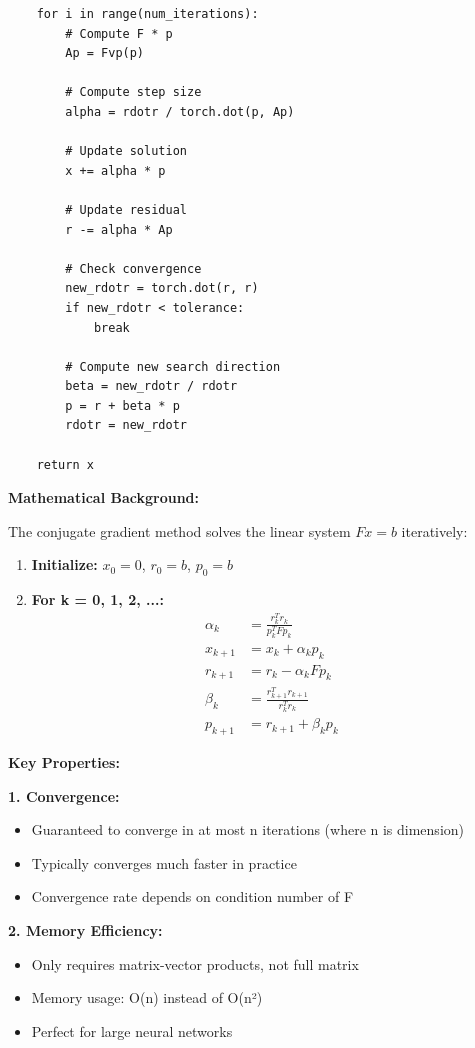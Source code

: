 \documentclass[12pt]{article}
\begin{document}
{{\begin{verbatim}
    for i in range(num_iterations):
        # Compute F * p
        Ap = Fvp(p)
        
        # Compute step size
        alpha = rdotr / torch.dot(p, Ap)
        
        # Update solution
        x += alpha * p
        
        # Update residual
        r -= alpha * Ap
        
        # Check convergence
        new_rdotr = torch.dot(r, r)
        if new_rdotr < tolerance:
            break
        
        # Compute new search direction
        beta = new_rdotr / rdotr
        p = r + beta * p
        rdotr = new_rdotr
    
    return x
\end{verbatim}

\textbf{Mathematical Background:}

The conjugate gradient method solves the linear system $Fx = b$ iteratively:

\begin{enumerate}
\item \textbf{Initialize:} $x_0 = 0$, $r_0 = b$, $p_0 = b$
\item \textbf{For k = 0, 1, 2, ...:}
\begin{align}
\alpha_k &= \frac{r_k^T r_k}{p_k^T F p_k} \\
x_{k+1} &= x_k + \alpha_k p_k \\
r_{k+1} &= r_k - \alpha_k F p_k \\
\beta_k &= \frac{r_{k+1}^T r_{k+1}}{r_k^T r_k} \\
p_{k+1} &= r_{k+1} + \beta_k p_k
\end{align}
\end{enumerate}

\textbf{Key Properties:}

\textbf{1. Convergence:}
\begin{itemize}
\item Guaranteed to converge in at most n iterations (where n is dimension)
\item Typically converges much faster in practice
\item Convergence rate depends on condition number of F
\end{itemize}

\textbf{2. Memory Efficiency:}
\begin{itemize}
\item Only requires matrix-vector products, not full matrix
\item Memory usage: O(n) instead of O(n²)
\item Perfect for large neural networks
\end{itemize}

}}
\end{document}
